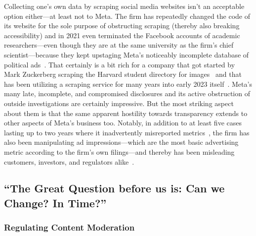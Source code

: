 Collecting one's own data by scraping social media websites isn't an acceptable
option either---at least not to Meta. The firm has repeatedly changed the code
of its website for the sole purpose of obstructing scraping (thereby also
breaking accessibility) and in 2021 even terminated the Facebook accounts of
academic researchers---even though they are at the same university as the firm's
chief  scientist---because they kept upstaging Meta's noticeably incomplete
database of political
ads~\cite{EdelsonMcCoy2021a,Faife2021a,MerrillTobin2019,Roose2021a}. That
certainly is a bit rich for a company that got started by Mark Zuckerberg
scraping the Harvard student directory for images~\cite{Madrigal2019} and that
has been utilizing a scraping service for many years into early 2023
itself~\cite{Newman2023}. Meta's many late, incomplete, and compromised
disclosures and its active obstruction of outside investigations are certainly
impressive. But the most striking aspect about them is that the same apparent
hostility towards transparency extends to other aspects of Meta's business too.
Notably, in addition to at least five cases lasting up to two years where it
inadvertently misreported
metrics~\cite{BruellPatel2020,Hutchinson2016,Hutchinson2016a,Hutchinson2016b,Hutchinson2017,VranicaMarshall2016},
the firm has also been manipulating ad impressions---which are the most basic
advertising metric according to the firm's own  filings---and thereby has
been misleading customers, investors, and regulators alike~.


\let\Oldthefootnote\thefootnote
\renewcommand*{\thefootnote}{\ding{164}}
\subsection{``The Great Question before us is: Can we Change? In Time?''%
\texorpdfstring{\>\!\protect\footnotemark}{}}
\let\thefootnote\Oldthefootnote

\subsubsection{Regulating Content Moderation}
\label{sec:regulating:moderation}

